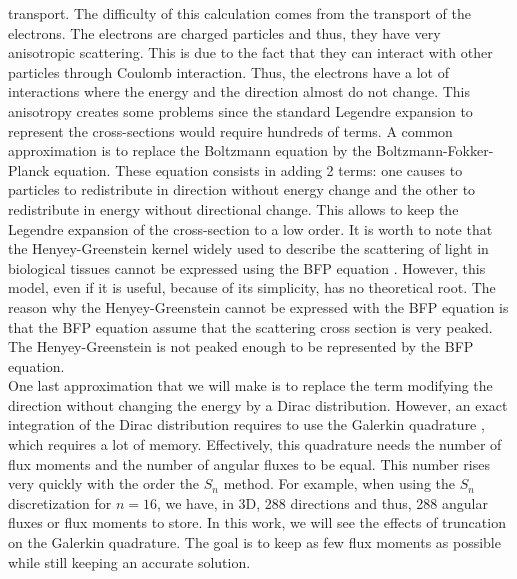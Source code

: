 transport. The difficulty of this calculation comes from the transport of the
electrons. The electrons are charged particles and thus, they have very
anisotropic scattering. This is due to the fact that they can interact with other
particles through Coulomb interaction. Thus, the electrons have a lot of
interactions where the energy and the direction almost do not change. This 
anisotropy creates some problems since the standard Legendre expansion to represent 
the cross-sections would require hundreds of terms. A common approximation is to 
replace the Boltzmann equation by the Boltzmann-Fokker-Planck equation. These 
equation consists in adding 2 terms: one causes to particles to redistribute in 
direction without energy change and the other to redistribute in energy without 
directional change\cite{morel_81}. This allows to keep the Legendre expansion of the 
cross-section to a low order. It is worth to note that the Henyey-Greenstein kernel
widely used to describe the scattering of light in biological tissues cannot be
expressed using the BFP equation \cite{larsen}. However, this model, even if
it is useful, because of its simplicity, has no theoretical root. The reason
why the Henyey-Greenstein cannot be expressed with the BFP equation is that the BFP 
equation assume that the scattering cross section is very  peaked. The 
Henyey-Greenstein is not peaked enough to be represented by the BFP
equation.\\ 
One last approximation that we will make is to replace the term modifying the
direction without changing the energy by a Dirac distribution. However, an exact 
integration of the Dirac distribution requires to use the Galerkin quadrature 
\cite{graal}, which requires a lot of memory. Effectively, this quadrature needs 
the number of flux moments and the number of angular fluxes to be equal. This number 
rises very quickly with the order the $S_n$ method. For example, when using the $S_n$ 
discretization for $n=16$, we have, in 3D, 288 directions and thus, 288 angular 
fluxes or flux moments to store. In this work, we will see the effects of truncation 
on the Galerkin quadrature. The goal is to keep as few flux moments as possible while 
still keeping an accurate solution.
